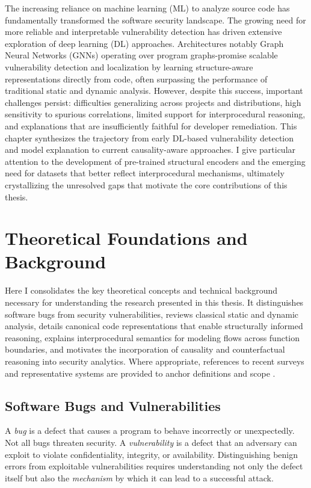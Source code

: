 \documentclass{buthesis}
\begin{document}
The increasing reliance on machine learning (ML) to analyze source code has fundamentally transformed the software security landscape. The growing need for more reliable and interpretable vulnerability detection has driven extensive exploration of deep learning (DL) approaches. Architectures notably Graph Neural Networks (GNNs) operating over program graphs-promise scalable vulnerability detection and localization by learning structure-aware representations directly from code, often surpassing the performance of traditional static and dynamic analysis. However, despite this success, important challenges persist: difficulties generalizing across projects and distributions, high sensitivity to spurious correlations, limited support for interprocedural reasoning, and explanations that are insufficiently faithful for developer remediation. This chapter synthesizes the trajectory from early DL-based vulnerability detection and model explanation to current causality-aware approaches. I give particular attention to the development of pre-trained structural encoders and the emerging need for datasets that better reflect interprocedural mechanisms, ultimately crystallizing the unresolved gaps that motivate the core contributions of this thesis.

\section{Theoretical Foundations and Background}


Here I consolidates the key theoretical concepts and technical background necessary for understanding the research presented in this thesis. It distinguishes software bugs from security vulnerabilities, reviews classical static and dynamic analysis, details canonical code representations that enable structurally informed reasoning, explains interprocedural semantics for modeling flows across function boundaries, and motivates the incorporation of causality and counterfactual reasoning into security analytics. Where appropriate, references to recent surveys and representative systems are provided to anchor definitions and scope \cite{Chakraborty2020,Liu2020}.

\subsection{Software Bugs and Vulnerabilities}
\label{sec:intro-bugs}

A \emph{bug} is a defect that causes a program to behave incorrectly or unexpectedly. Not all bugs threaten security. A \emph{vulnerability} is a defect that an adversary can exploit to violate confidentiality, integrity, or availability. Distinguishing benign errors from exploitable vulnerabilities requires understanding not only the defect itself but also the \emph{mechanism} by which it can lead to a successful attack.
\end{document}
